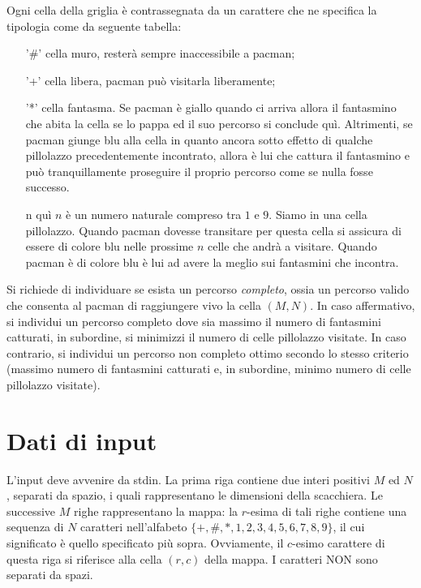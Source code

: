 Ogni cella della griglia è contrassegnata da un carattere che ne specifica la tipologia come da seguente tabella:
\begin{itemize}
   \item['\#'] cella muro, resterà sempre inaccessibile a pacman;
   \item['+'] cella libera, pacman può visitarla liberamente;
   \item['*'] cella fantasma. Se pacman è giallo quando ci arriva allora il fantasmino che abita la cella se lo pappa ed il suo percorso si conclude quì. Altrimenti, se pacman giunge blu alla cella in quanto ancora sotto effetto di qualche pillolazzo precedentemente incontrato, allora è lui che cattura il fantasmino e può tranquillamente proseguire il proprio percorso come se nulla fosse successo.
   \item[n] quì $n$ è un numero naturale compreso tra $1$ e $9$. Siamo in una cella pillolazzo. Quando pacman dovesse transitare per questa cella si assicura di essere di colore blu nelle prossime $n$ celle che andrà a visitare. Quando pacman è di colore blu è lui ad avere la meglio sui fantasmini che incontra.
\end{itemize}

Si richiede di individuare se esista un percorso \emph{completo}, ossia un percorso valido che consenta al pacman di raggiungere vivo la cella $(M,N)$. In caso affermativo, si individui un percorso completo dove sia massimo il numero di fantasmini catturati, in subordine, si minimizzi il numero di celle pillolazzo visitate. In caso contrario, si individui un percorso non completo ottimo secondo lo stesso criterio (massimo numero di fantasmini catturati e, in subordine, minimo numero di celle pillolazzo visitate).

\section*{Dati di input}

L'input deve avvenire da stdin.
La prima riga contiene due interi positivi $M$ ed $N$, separati da spazio, i quali rappresentano le dimensioni della scacchiera.
Le successive $M$ righe rappresentano la mappa: la $r$-esima di tali righe contiene una
sequenza di $N$ caratteri nell'alfabeto $\{+,\#,*,1,2,3,4,5,6,7,8,9\}$, il cui significato è quello specificato più sopra.
Ovviamente, il $c$-esimo carattere di questa riga si riferisce alla cella $(r, c)$ della mappa. I caratteri NON sono separati da spazi.

